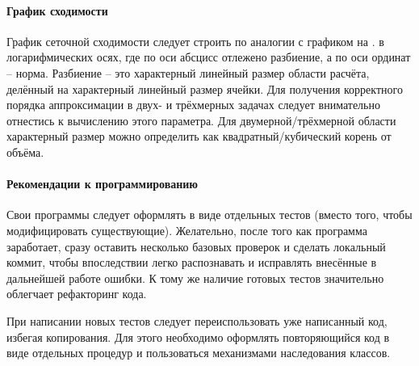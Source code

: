 \paragraph{График сходимости}
График сеточной сходимости следует строить по аналогии с графиком на .
в логарифмических осях, где по оси абсцисс отлежено разбиение, а по оси ординат -- норма.
Разбиение -- это характерный линейный размер области расчёта, делённый на характерный линейный размер ячейки.
Для получения корректного порядка аппроксимации в двух- и трёхмерных задачах следует внимательно отнестись к вычислению этого параметра.
Для двумерной/трёхмерной области характерный размер можно определить как квадратный/кубический корень от объёма.

\paragraph{Рекомендации к программированию}
Свои программы следует оформлять в виде отдельных тестов (вместо того, чтобы модифицировать существующие).
Желательно, после того как программа заработает, сразу оставить несколько базовых  проверок и
сделать локальный коммит, чтобы впоследствии легко распознавать и исправлять внесённые в дальнейшей работе ошибки.
К тому же наличие готовых тестов значительно облегчает рефакторинг кода.

При написании новых тестов следует переиспользовать уже написанный код, избегая копирования.
Для этого необходимо оформлять повторяющийся код в виде отдельных процедур и пользоваться механизмами наследования классов.
